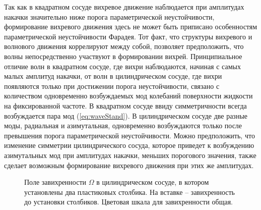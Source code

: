 Так как в квадратном сосуде вихревое движение наблюдается при амплитудах накачки значительно ниже порога параметрической неустойчивости, формирование вихревого движения здесь не может быть приписано особенностям параметрической неустойчивости Фарадея. Тот факт, что структуры вихревого и волнового движения коррелируют между собой, позволяет предположить, что волны непосредственно участвуют в формировании вихрей. Принципиальное отличие волн в квадратном сосуде, где вихри наблюдаются, начиная с самых малых амплитуд накачки, от волн в цилиндрическом сосуде, где вихри появляются только при достижении порога неустойчивости, связано с количеством одновременно возбуждаемых мод колебаний поверхности жидкости на фиксированной частоте. В квадратном сосуде ввиду симметричности всегда возбуждается пара мод (\ref{eq:waveStand}). В цилиндрическом сосуде две разные моды, радиальная и азимутальная, одновременно возбуждаются только после превышения порога параметрической неустойчивости. Можно предположить, что изменение симметрии цилиндрического сосуда, которое приведет к возбуждению азимутальных мод при амплитудах накачки, меньших порогового значения, также сделает возможным формирование вихревого движения при этих же амплитудах.

\begin{figure}[ht]
 \begin{minipage}[ht]{0.49\linewidth}
 \end{minipage}
 \hfill
 \begin{minipage}[ht]{0.49\linewidth}
 \end{minipage}
 \caption{Поле завихренности $\Omega$ в цилиндрическом сосуде, в котором установлены два пластиковых столбика. На вставке – завихренность до установки столбиков. Цветовая шкала для завихренности общая.}
 \label{img:vort_st} 
\end{figure}

